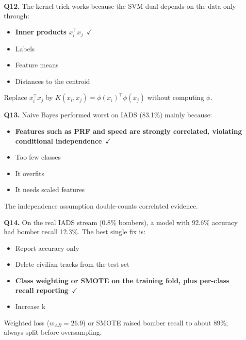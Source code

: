 \documentclass[11pt]{article}
\begin{document}
{\noindent\textbf{Q12.} The kernel trick works because the SVM dual depends on the data only through:\begin{itemize}[leftmargin=2.2em,itemsep=0pt,topsep=1pt]\item[\textbf{A.}] \textbf{Inner products $x_i^\top x_j$}~{\color{GrnN}$\checkmark$}\item[B.] Labels\item[C.] Feature means\item[D.] Distances to the centroid\end{itemize} Replace $x_i^\top x_j$ by $K(x_i,x_j)=\phi(x_i)^\top\phi(x_j)$ without computing $\phi$.\par\medskip

\noindent\textbf{Q13.} Naive Bayes performed worst on IADS (83.1\%) mainly because:\begin{itemize}[leftmargin=2.2em,itemsep=0pt,topsep=1pt]\item[\textbf{A.}] \textbf{Features such as PRF and speed are strongly correlated, violating conditional independence}~{\color{GrnN}$\checkmark$}\item[B.] Too few classes\item[C.] It overfits\item[D.] It needs scaled features\end{itemize} The independence assumption double-counts correlated evidence.\par\medskip

\noindent\textbf{Q14.} On the real IADS stream (0.8\% bombers), a model with 92.6\% accuracy had bomber recall 12.3\%. The best single fix is:\begin{itemize}[leftmargin=2.2em,itemsep=0pt,topsep=1pt]\item[A.] Report accuracy only\item[B.] Delete civilian tracks from the test set\item[\textbf{C.}] \textbf{Class weighting or SMOTE on the training fold, plus per-class recall reporting}~{\color{GrnN}$\checkmark$}\item[D.] Increase k\end{itemize} Weighted loss ($w_{AB}=26.9$) or SMOTE raised bomber recall to about 89\%; always split before oversampling.\par\medskip

}
\end{document}
